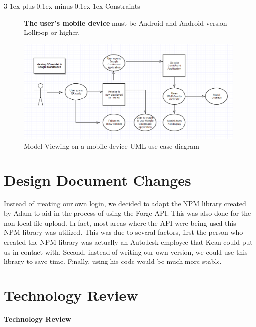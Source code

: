 \documentclass[letterpaper, 10pt, draftclsnofoot, compsoc, onecolumn]{IEEEtran}
\makeatletter
\def\subsubsection{\@startsection{subsubsection}%
                                 {3}%
                                 {\z@}%
                                 {1ex plus 0.1ex minus 0.1ex}%
                                 {1ex}%
                                 {\normalfont\normalsize}}%
\makeatother
\begin{document}
\subsubsection{Constraints}
\begin{description}
	\item[]\textbf{The user's mobile device} must be Android and Android version Lollipop or higher. 
\end{description}
\begin{figure}[ht]
	\includegraphics[scale=0.6]{ViewingUseCase.png}
	\caption{Model Viewing on a mobile device UML use case diagram}
\end{figure}

\newpage
\section{Design Document Changes}
Instead of creating our own login, we decided to adapt the NPM library created by Adam to aid in the process of using the Forge API. This was also done for the non-local file upload. In fact, most areas where the API were being used this NPM library was utilized. This was due to several factors, first the person who created the NPM library was actually an Autodesk employee that Kean could put us in contact with. Second, instead of writing our own version, we could use this library to save time. Finally, using his code would be much more stable. 

\newpage
\section{Technology Review}
\thispagestyle{FirstPage}

\bigskip

{\centering{}\bfseries\color{black}
Technology Review
\par}


\bigskip
\end{document}
